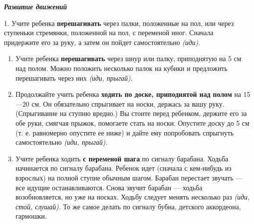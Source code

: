 \documentclass{book}
\renewcommand{\emph}[1]{\textit{#1}}
\begin{document}
\emph{\textbf{Развитие движений}}

1. Учите ребенка \textbf{перешагивать} через палки, положенные на пол,
или через ступеньки стремянки, положенной на пол, с переменой нног.
Сначала придержите его за руку, а затем он пойдет самостоятельно
\emph{(иди).}


\begin{enumerate}
\def\labelenumi{\arabic{enumi}.}
\setcounter{enumi}{1}
\item
  
  Учите ребенка \textbf{перешагивать} через шнур или палку, приподнятую
  на 5 см над полом. Можно положить несколько палок на кубики и
  предложить перешагивать через них \emph{(иди, прыгай).}
  
\item
  
  Продолжайте учить ребенка \textbf{ходить по доске, приподнятой над
  полом} на 15---20 см. Он обязательно спрыгивает на носки, держась за
  вашу руку. (Спрыгивание на ступню вредно.) Вы стоите перед ребенком,
  держите его за обе руки, смягчая прыжок, помогаете стать на носки.
  Опустите доску до 5 см (т. е. равномерно опустите ее ниже) и дайте ему
  попробовать спрыгнуть самостоятельно \emph{(иди, прыгай).}
  
\item
  
  Учите ребенка ходить \textbf{с переменой шага} по сигналу барабана.
  Ходьба начинается по сигналу барабана. Ребенок идет (сначала с
  кем-нибудь из взрослых) на полной ступне обычным шагом. Барабан
  перестает звучать --- все идущие останавливаются. Снова звучит барабан
  --- ходьба возобновляется, но уже на носках. Ходьбу следует менять
  несколько раз \emph{(иди, стой, слушай).} То же самое делать по
  сигналу бубна, детского аккордеона, гармошки.
  
\end{enumerate}
\end{document}
